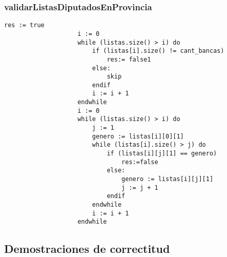 \documentclass[10pt,a4paper]{article}
\begin{document}
		\subsubsection{validarListasDiputadosEnProvincia}
			\begin{minipage}[t]{\textwidth}
				\begin{lstlisting}[label=code:for]
					res := true
					i := 0
					while (listas.size() > i) do
						if (listas[i].size() != cant_bancas) 
							res:= false1
						else:
							skip
						endif
						i := i + 1
					endwhile
					i := 0
					while (listas.size() > i) do
                        j := 1
						genero := listas[i][0][1]
						while (listas[i].size() > j) do
							if (listas[i][j][1] == genero) 
								res:=false
							else:
								genero := listas[i][j][1]
								j := j + 1
							endif
					    endwhile
						i := i + 1
					endwhile
				\end{lstlisting}
			\end{minipage}
		
	\subsection{Demostraciones de correctitud}
\end{document}
